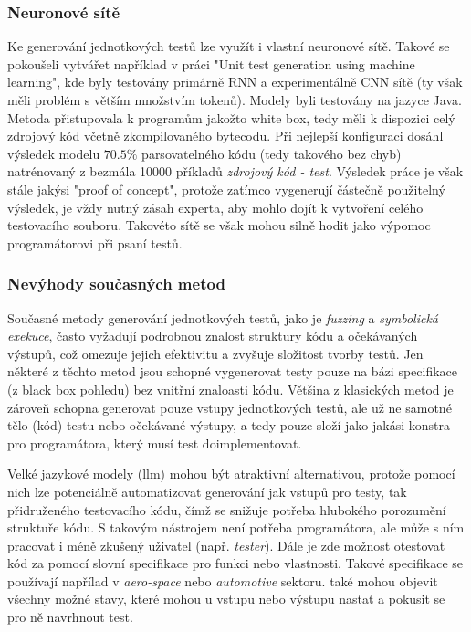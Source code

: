 \documentclass[czech, ma, kiv, he, iso690alph, pdf, viewonly]{fasthesis}
\begin{document}
        \subsubsection{Neuronové sítě}
        Ke generování jednotkových testů lze využít i vlastní neuronové sítě. Takové se pokoušeli vytvářet například v práci "Unit test generation using machine learning"\cite{Saes2018UnitTestGeneration}, kde byly testovány primárně RNN a experimentálně CNN sítě (ty však měli problém s větším množstvím tokenů). Modely byli testovány na jazyce Java. Metoda přistupovala k programům jakožto white box, tedy měli k dispozici celý zdrojový kód včetně zkompilovaného bytecodu. Při nejlepší konfiguraci dosáhl výsledek modelu \(70.5\%\) parsovatelného kódu (tedy takového bez chyb) natrénovaný z bezmála 10000 příkladů \textit{zdrojový kód - test}. Výsledek práce je však stále jakýsi "proof of concept", protože zatímco vygenerují částečně použitelný výsledek, je vždy nutný zásah experta, aby mohlo dojít k vytvoření celého testovacího souboru. Takovéto sítě se však mohou silně hodit jako výpomoc programátorovi při psaní testů.

        \subsubsection{Nevýhody současných metod}
        Současné metody generování jednotkových testů, jako je \textit{fuzzing} a \textit{symbolická exekuce}, často vyžadují podrobnou znalost struktury kódu a očekávaných výstupů, což omezuje jejich efektivitu a zvyšuje složitost tvorby testů. Jen některé z těchto metod jsou schopné vygenerovat testy pouze na bázi specifikace (z black box pohledu) bez vnitřní znaloasti kódu. Většina z klasických metod je zároveň schopna generovat pouze vstupy jednotkových testů, ale už ne samotné tělo (kód) testu nebo očekávané výstupy, a tedy pouze složí jako jakási konstra pro programátora, který musí test doimplementovat.

        Velké jazykové modely (\gls{llm}) mohou být atraktivní alternativou, protože pomocí nich lze potenciálně automatizovat generování jak vstupů pro testy, tak přidruženého testovacího kódu, čímž se snižuje potřeba hlubokého porozumění struktuře kódu. S takovým nástrojem není potřeba programátora, ale může s ním pracovat i méně zkušený uživatel (např. \textit{tester}). Dále je zde možnost otestovat kód za pomocí slovní specifikace pro funkci nebo vlastnosti. Takové specifikace se používají napřílad v \textit{aero-space} nebo \textit{automotive} sektoru.  také mohou objevit všechny možné stavy, které mohou u vstupu nebo výstupu nastat a pokusit se pro ně navrhnout test.
\end{document}
